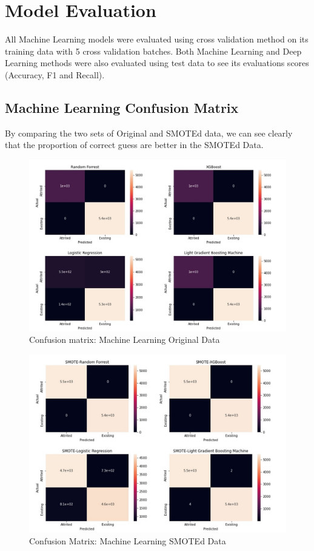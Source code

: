 \documentclass{homeworg}
\begin{document}
\section{Model Evaluation}
All Machine Learning models were evaluated using cross validation method on its training data with 5 cross validation batches.
Both Machine Learning and Deep Learning methods were also evaluated using test data to see its evaluations scores (Accuracy, F1 and Recall).

\subsection{Machine Learning Confusion Matrix}
By comparing the two sets of Original and SMOTEd data, we can see clearly that the proportion of correct guess are better in the SMOTEd Data.
\begin{figure}[H]
    \centering
    \includegraphics[scale=0.6]{figure/ML No SMOTE.jpg}
    \caption{Confusion matrix: Machine Learning Original Data}
    \label{fig:MLoriCM}
\end{figure}

\begin{figure}[H]
    \centering
    \includegraphics[scale=0.6]{figure/ML with SMOTE.jpg}
    \caption{Confusion Matrix: Machine Learning SMOTEd Data}
    \label{fig:MLSmotedCM}
\end{figure}
\end{document}
